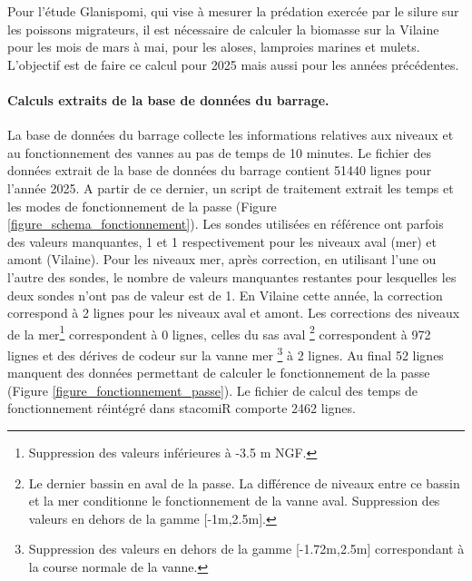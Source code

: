 \documentclass[11pt,twocolumn,titlepage,twoside]{article}\usepackage[]{graphicx}\usepackage[]{xcolor}
\begin{document}
Pour l'étude Glanispomi, qui vise à mesurer la prédation exercée par le
silure sur les poissons migrateurs, il est nécessaire de calculer la biomasse
sur la Vilaine pour les mois de mars à mai, pour les aloses, lamproies marines
et mulets. L'objectif est de faire ce calcul pour 2025 mais aussi pour les
années précédentes.




\paragraph{Calculs extraits de la base de données du barrage.}

La base de données du barrage collecte les informations relatives aux niveaux et
au fonctionnement des vannes au pas de temps de 10 minutes. Le fichier des données
extrait de la base de données du barrage contient
\textcolor{orange_EV}{\num{51440}} lignes pour l'année 2025. A partir
de ce dernier, un script de traitement extrait les temps et les modes de fonctionnement de la
passe (Figure \ref{figure_schema_fonctionnement}).
Les sondes utilisées en référence ont parfois des valeurs manquantes,
 \textcolor{orange_EV}{\num{1}} et \textcolor{orange_EV}{\num{1}} respectivement
 pour les niveaux aval (mer) et amont (Vilaine).
Pour les niveaux mer, après correction, en utilisant l'une ou l'autre des
sondes, le nombre de valeurs manquantes restantes pour lesquelles les deux sondes n'ont pas de
valeur est de \textcolor{orange_EV}{\num{1}}. En Vilaine
cette année, la correction correspond à
\textcolor{orange_EV}{\num{2}} lignes pour les
niveaux aval et amont.
Les corrections des niveaux de la mer\footnote{Suppression
des valeurs inférieures à -3.5 m NGF.} correspondent à
\textcolor{orange_EV}{\num{0}} lignes, celles du sas aval \footnote{Le dernier
bassin en aval de la passe. La différence de niveaux entre ce bassin et la mer
conditionne le fonctionnement de la vanne aval. Suppression des valeurs en
dehors de la gamme [-1m,2.5m].} correspondent à \textcolor{orange_EV}{\num{972}} lignes et des
dérives de codeur sur la vanne mer \footnote{Suppression des valeurs en dehors de la gamme
[-1.72m,2.5m] correspondant à la course normale de la vanne.} à
\textcolor{orange_EV}{\num{2}} lignes.
Au final \textcolor{orange_EV}{\num{52}} lignes manquent des données permettant de
calculer le fonctionnement de la passe (Figure \ref{figure_fonctionnement_passe}). Le fichier de calcul des temps de
fonctionnement réintégré dans stacomiR comporte
\textcolor{orange_EV}{\num{2462}} lignes.
\end{document}
